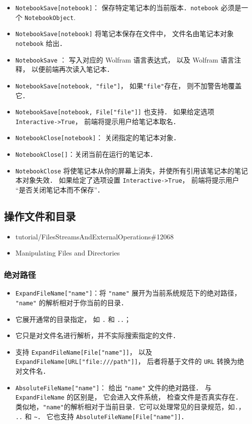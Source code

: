 \begin{itemize}
\item \verb`NotebookSave[notebook]`： 保存特定笔记本的当前版本．\verb`notebook` 必须是一个 \verb`NotebookObject`.
\item \verb`NotebookSave[notebook]` 将笔记本保存在文件中， 文件名由笔记本对象 \verb`notebook` 给出．
\item \verb`NotebookSave` ： 写入对应的 Wolfram 语言表达式， 以及 Wolfram 语言注释， 以便前端再次读入笔记本．
\item \verb`NotebookSave[notebook, "file"]`， 如果\verb`"file"`存在， 则不加警告地覆盖它．
\item \verb`NotebookSave[notebook, File["file"]]` 也支持．
如果给定选项 \verb`Interactive->True`， 前端将提示用户给笔记本取名．
\item \verb`NotebookClose[notebook]`： 关闭指定的笔记本对象．
\item \verb`NotebookClose[]`：关闭当前在运行的笔记本．
\item \verb`NotebookClose` 将使笔记本从你的屏幕上消失，并使所有引用该笔记本的笔记本对象失效．
如果给定了选项设置 \verb`Interactive->True`， 前端将提示用户 “是否关闭笔记本而不保存”．
\end{itemize}




\subsection{操作文件和目录}

\begin{itemize}
\item tutorial/FilesStreamsAndExternalOperations\#12068
\item Manipulating Files and Directories
\end{itemize}

\subsubsection{绝对路径}

\begin{itemize}
\item \verb`ExpandFileName["name"]`：将 \verb`"name"` 展开为当前系统规范下的绝对路径， \verb`"name"` 的解析相对于你当前的目录．
\item 它展开通常的目录指定， 如 \verb`.` 和 \verb`..`；
\item 它只是对文件名进行解析，并不实际搜索指定的文件．
\item 支持 \verb`ExpandFileName[File["name"]]`， 以及 \verb`ExpandFileName[URL["file:///path"]]`， 
后者将基于文件的 \verb`URL` 转换为绝对文件名．
\item \verb`AbsoluteFileName["name"]`： 给出 \verb`"name"` 文件的绝对路径． 
与 \verb`ExpandFileName` 的区别是， 它会进入文件系统， 检查文件是否真实存在．
类似地，\verb`"name"`的解析相对于当前目录．它可以处理常见的目录规范，如\verb`.`， \verb`..` 和 \verb`~`．
它也支持 \verb`AbsoluteFileName[File["name"]]`．
\end{itemize}

